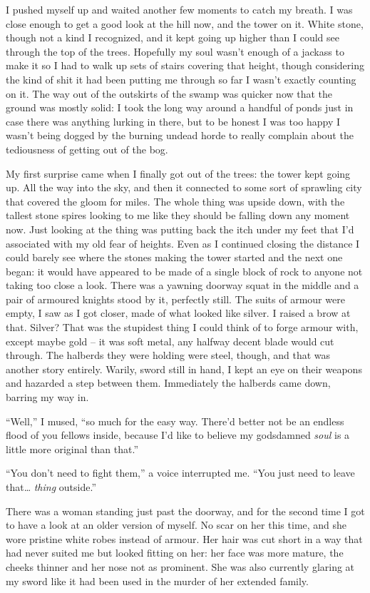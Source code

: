 \documentclass[12pt, openany]{book}
\begin{document}
I pushed myself up and waited another few moments to catch my breath. I was close enough to get a good look at the hill now, and the tower on it. White stone, though not a kind I recognized, and it kept going up higher than I could see through the top of the trees. Hopefully my soul wasn’t enough of a jackass to make it so I had to walk up sets of stairs covering that height, though considering the kind of shit it had been putting me through so far I wasn’t exactly counting on it. The way out of the outskirts of the swamp was quicker now that the ground was mostly solid: I took the long way around a handful of ponds just in case there was anything lurking in there, but to be honest I was too happy I wasn’t being dogged by the burning undead horde to really complain about the tediousness of getting out of the bog.

My first surprise came when I finally got out of the trees: the tower kept going up. All the way into the sky, and then it connected to some sort of sprawling city that covered the gloom for miles. The whole thing was upside down, with the tallest stone spires looking to me like they should be falling down any moment now. Just looking at the thing was putting back the itch under my feet that I’d associated with my old fear of heights. Even as I continued closing the distance I could barely see where the stones making the tower started and the next one began: it would have appeared to be made of a single block of rock to anyone not taking too close a look. There was a yawning doorway squat in the middle and a pair of armoured knights stood by it, perfectly still. The suits of armour were empty, I saw as I got closer, made of what looked like silver. I raised a brow at that. Silver? That was the stupidest thing I could think of to forge armour with, except maybe gold – it was soft metal, any halfway decent blade would cut through. The halberds they were holding were steel, though, and that was another story entirely. Warily, sword still in hand, I kept an eye on their weapons and hazarded a step between them. Immediately the halberds came down, barring my way in.

“Well,” I mused, “so much for the easy way. There’d better not be an endless flood of you fellows inside, because I’d like to believe my godsdamned \textit{soul} is a little more original than that.”

“You don’t need to fight them,” a voice interrupted me. “You just need to leave that… \textit{thing} outside.”

There was a woman standing just past the doorway, and for the second time I got to have a look at an older version of myself. No scar on her this time, and she wore pristine white robes instead of armour. Her hair was cut short in a way that had never suited me but looked fitting on her: her face was more mature, the cheeks thinner and her nose not as prominent. She was also currently glaring at my sword like it had been used in the murder of her extended family.
\end{document}
